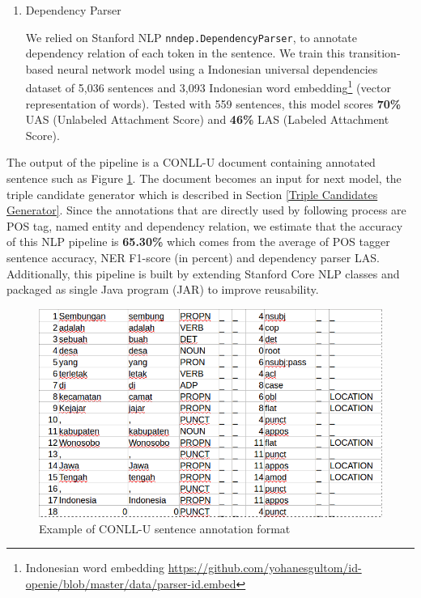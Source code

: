 \documentclass[conference,compsoc,12pt]{IEEEtran}
\begin{document}
\begin{enumerate}
\item Dependency Parser

We relied on Stanford NLP \verb|nndep.DependencyParser|\cite{chen2014fast}, to annotate dependency relation of each token in the sentence. We train this transition-based neural network model using a Indonesian universal dependencies dataset of 5,036 sentences and 3,093 Indonesian word embedding\footnote{Indonesian word embedding \url{https://github.com/yohanesgultom/id-openie/blob/master/data/parser-id.embed}} (vector representation of words). Tested with 559 sentences, this model scores \textbf{70\%} UAS (Unlabeled Attachment Score) and \textbf{46\%} LAS (Labeled Attachment Score).

\end{enumerate}

The output of the pipeline is a CONLL-U document containing annotated sentence such as Figure \ref{fig_conllu_example}. The document becomes an input for next model, the triple candidate generator which is described in Section \ref{Triple Candidates Generator}. Since the annotations that are directly used by following process are POS tag, named entity and dependency relation, we estimate that the accuracy of this NLP pipeline is \textbf{65.30\%} which comes from the average of POS tagger sentence accuracy, NER F1-score (in percent) and dependency parser LAS. Additionally, this pipeline is built by extending Stanford Core NLP classes and packaged as single Java program (JAR) to improve reusability.

\begin{figure}
\centering
\includegraphics[scale=0.35]{../images/conllu_example.png}
\caption{Example of CONLL-U sentence annotation format}
\label{fig_conllu_example}
\end{figure}
\end{document}
